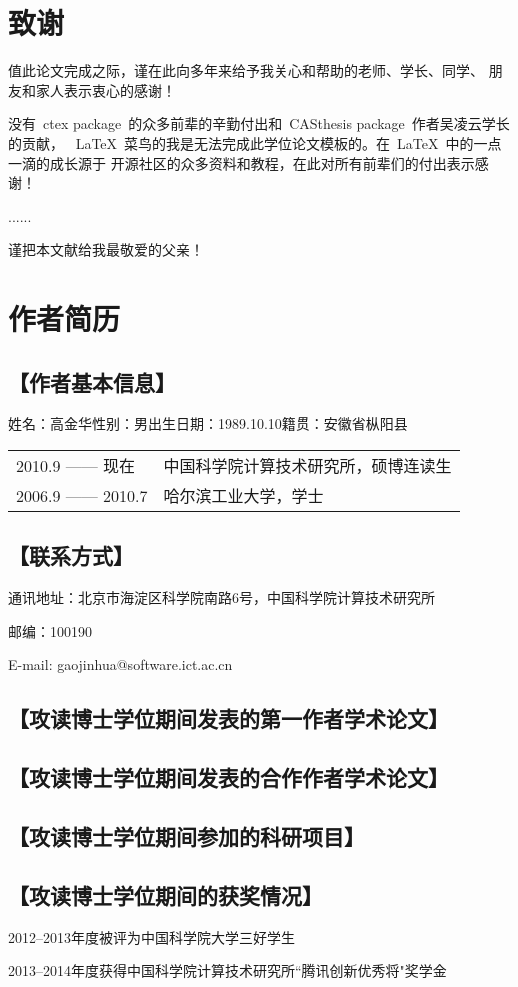 \chapter{致\quad 谢}

值此论文完成之际，谨在此向多年来给予我关心和帮助的老师、学长、同学、
朋友和家人表示衷心的感谢！

没有~ctex package~的众多前辈的辛勤付出和~CASthesis package~作者吴凌云学长的贡献，
~\LaTeX{}~菜鸟的我是无法完成此学位论文模板的。在~\LaTeX{}~中的一点一滴的成长源于
开源社区的众多资料和教程，在此对所有前辈们的付出表示感谢！

......

谨把本文献给我最敬爱的父亲！

\chapter{作者简历}

\section*{【作者基本信息】}
姓名：高金华\quad 性别：男\quad 出生日期：1989.10.10\quad 籍贯：安徽省枞阳县

\begin{table}[!htb]
    \setlength{\tabcolsep}{8pt}%
    \renewcommand{\arraystretch}{1.2}%
    \begin{tabular}{ll}
        \hspace{16pt}2010.9 —— 现在 & 中国科学院计算技术研究所，硕博连读生 \\
        \hspace{16pt}2006.9 —— 2010.7 & 哈尔滨工业大学，学士 \\
    \end{tabular}
\end{table}

\section*{【联系方式】}

通讯地址：北京市海淀区科学院南路6号，中国科学院计算技术研究所

邮编：100190

E-mail: gaojinhua@software.ict.ac.cn

\section*{【攻读博士学位期间发表的第一作者学术论文】}
\section*{【攻读博士学位期间发表的合作作者学术论文】}
\section*{【攻读博士学位期间参加的科研项目】}
\section*{【攻读博士学位期间的获奖情况】}
2012--2013年度被评为中国科学院大学三好学生

2013--2014年度获得中国科学院计算技术研究所``腾讯创新优秀将"奖学金
